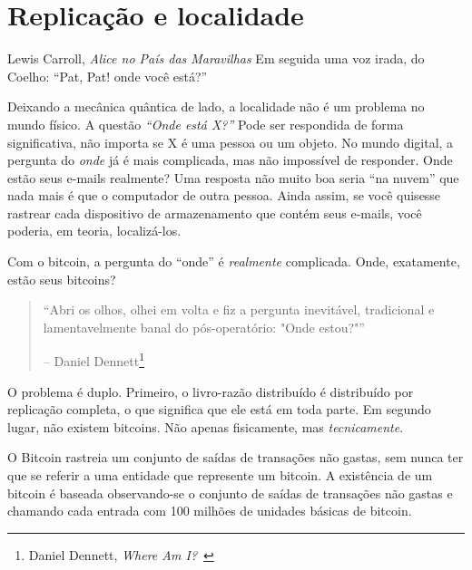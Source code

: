 \chapter{Replicação e localidade}
\label{les:3}

\begin{chapquote}{Lewis Carroll, \textit{Alice no País das Maravilhas}}
Em seguida uma voz irada, do Coelho: \enquote{Pat, Pat! onde você está?}
\end{chapquote}

Deixando a mecânica quântica de lado, a localidade não é um problema no mundo físico. A questão \textit{\enquote{Onde está X?}} Pode ser respondida de forma significativa, não importa se X é uma pessoa ou um objeto. No mundo digital, a pergunta do \textit{onde} já é mais complicada, mas não impossível de responder. Onde estão seus e-mails realmente? Uma resposta não muito boa seria \enquote{na nuvem} que nada mais é que o computador de outra pessoa. Ainda assim, se você quisesse rastrear cada dispositivo de armazenamento que contém seus e-mails, você poderia, em teoria, localizá-los.

Com o bitcoin, a pergunta do \enquote{onde} é \textit{realmente} complicada. Onde, exatamente, estão seus bitcoins?

\begin{quotation}\begin{samepage}
\enquote{Abri os olhos, olhei em volta e fiz a pergunta inevitável, tradicional e lamentavelmente banal do pós-operatório: "Onde estou?"}
\begin{flushright} -- Daniel Dennett\footnote{Daniel Dennett, \textit{Where Am I?}~\cite{where-am-i}}
\end{flushright}\end{samepage}\end{quotation}

O problema é duplo. Primeiro, o livro-razão distribuído é distribuído por replicação completa, o que significa que ele está em toda parte. Em segundo lugar, não existem bitcoins. Não apenas fisicamente, mas \textit{tecnicamente}.

O Bitcoin rastreia um conjunto de saídas de transações não gastas, sem nunca ter que se referir a uma entidade que represente um bitcoin. A existência de um bitcoin é baseada observando-se o conjunto de saídas de transações não gastas e chamando cada entrada com 100 milhões de unidades básicas de bitcoin.

